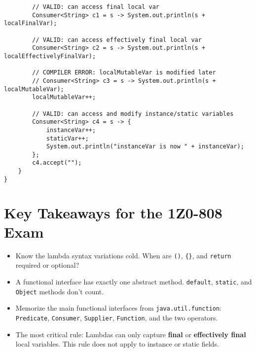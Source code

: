 \documentclass[12pt]{article}
\begin{document}
\begin{enumerate}[label=(\arabic*)]
\begin{verbatim}
        // VALID: can access final local var
        Consumer<String> c1 = s -> System.out.println(s + localFinalVar);

        // VALID: can access effectively final local var
        Consumer<String> c2 = s -> System.out.println(s + localEffectivelyFinalVar);

        // COMPILER ERROR: localMutableVar is modified later
        // Consumer<String> c3 = s -> System.out.println(s + localMutableVar);
        localMutableVar++;

        // VALID: can access and modify instance/static variables
        Consumer<String> c4 = s -> {
            instanceVar++;
            staticVar++;
            System.out.println("instanceVar is now " + instanceVar);
        };
        c4.accept("");
    }
}
\end{verbatim}

\section*{Key Takeaways for the 1Z0-808 Exam}
\begin{itemize}
    \item Know the lambda syntax variations cold. When are \texttt{()}, \texttt{\{\}}, and \texttt{return} required or optional?
    \item A functional interface has exactly one abstract method. \texttt{default}, \texttt{static}, and \texttt{Object} methods don't count.
    \item Memorize the main functional interfaces from \texttt{java.util.function}: \texttt{Predicate}, \texttt{Consumer}, \texttt{Supplier}, \texttt{Function}, and the two operators.
    \item The most critical rule: Lambdas can only capture \textbf{final} or \textbf{effectively final} local variables. This rule does not apply to instance or static fields.
\end{itemize}
\end{enumerate}
\end{document}
